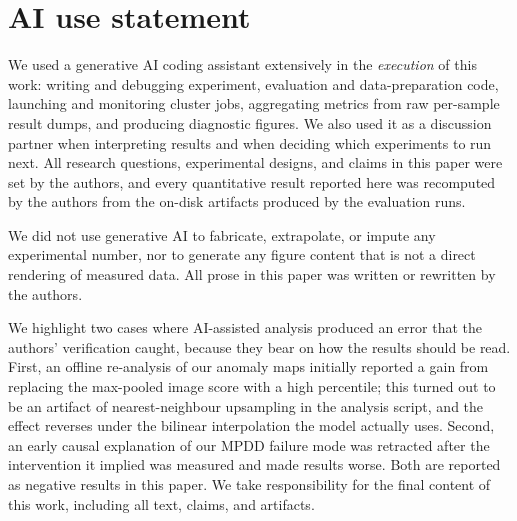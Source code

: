 
\section*{AI use statement}
We used a generative AI coding assistant extensively in the \emph{execution} of this
work: writing and debugging experiment, evaluation and data-preparation code,
launching and monitoring cluster jobs, aggregating metrics from raw per-sample
result dumps, and producing diagnostic figures. We also used it as a discussion
partner when interpreting results and when deciding which experiments to run
next. All research questions, experimental designs, and claims in this paper were
set by the authors, and every quantitative result reported here was recomputed by
the authors from the on-disk artifacts produced by the evaluation runs.

We did not use generative AI to fabricate, extrapolate, or impute any experimental
number, nor to generate any figure content that is not a direct rendering of
measured data. All prose in this paper was written or rewritten by the authors.

We highlight two cases where AI-assisted analysis produced an error that the
authors' verification caught, because they bear on how the results should be
read. First, an offline re-analysis of our anomaly maps initially reported a gain
from replacing the max-pooled image score with a high percentile; this turned out
to be an artifact of nearest-neighbour upsampling in the analysis script, and the
effect reverses under the bilinear interpolation the model actually uses. Second,
an early causal explanation of our MPDD failure mode was retracted after the
intervention it implied was measured and made results worse. Both are reported as
negative results in this paper. We take responsibility for the final content of
this work, including all text, claims, and artifacts.

